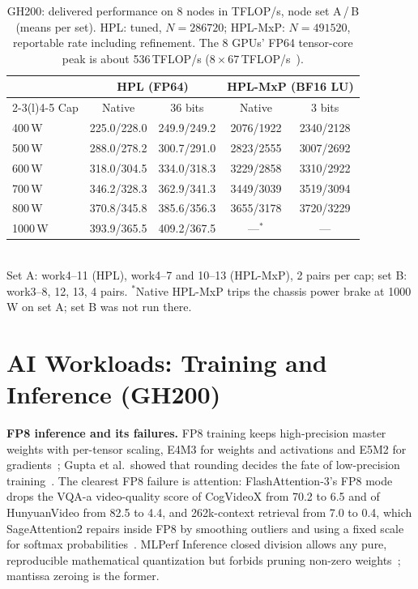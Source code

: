 \documentclass[conference]{IEEEtran}
\newcommand{\W}{\,W}
\begin{document}
\begin{table}[t]
\caption{GH200: delivered performance on 8 nodes in TFLOP/s, node set A\,/\,B (means per set). HPL: tuned, $N=286720$;
HPL-MxP: $N=491520$, reportable rate including refinement. The 8 GPUs' FP64 tensor-core peak is about 536\,TFLOP/s
($8\times67$\,TFLOP/s~\cite{NVIDIAGH200}).}\label{tab:hplperf}
\centering\footnotesize\setlength{\tabcolsep}{3pt}
\begin{tabular}{@{}lcccc@{}}
\toprule
& \multicolumn{2}{c}{HPL (FP64)} & \multicolumn{2}{c}{HPL-MxP (BF16 LU)} \\
\cmidrule(lr){2-3}\cmidrule(l){4-5}
Cap & Native & 36 bits & Native & 3 bits \\
\midrule
400\W & 225.0/228.0 & 249.9/249.2 & 2076/1922 & 2340/2128 \\
500\W & 288.0/278.2 & 300.7/291.0 & 2823/2555 & 3007/2692 \\
600\W & 318.0/304.5 & 334.0/318.3 & 3229/2858 & 3310/2922 \\
700\W & 346.2/328.3 & 362.9/341.3 & 3449/3039 & 3519/3094 \\
800\W & 370.8/345.8 & 385.6/356.3 & 3655/3178 & 3720/3229 \\
1000\W & 393.9/365.5 & 409.2/367.5 & ---$^{*}$ & --- \\
\bottomrule
\end{tabular}
\\[2pt]{\scriptsize Set A: work4--11 (HPL), work4--7 and 10--13 (HPL-MxP), 2 pairs per cap; set B: work3--8, 12, 13, 4 pairs.
$^{*}$Native HPL-MxP trips the chassis power brake at 1000\W{} on set A; set B was not run there.}
\end{table}

\section{AI Workloads: Training and Inference (GH200)}\label{sec:ai}
\textbf{FP8 inference and its failures.} FP8 training keeps high-precision master weights with per-tensor
scaling, E4M3 for weights and activations and E5M2 for gradients~\cite{Micikevicius2022}; Gupta et al.\ showed that
rounding decides the fate of low-precision training~\cite{Gupta2015}. The clearest FP8 failure is attention:
FlashAttention-3's FP8 mode drops the VQA-a video-quality score of CogVideoX from 70.2 to 6.5 and of HunyuanVideo from
82.5 to 4.4, and 262k-context retrieval from 7.0 to 0.4, which SageAttention2 repairs inside FP8 by smoothing outliers and using a fixed scale for softmax
probabilities~\cite{Zhang2025}. MLPerf Inference closed division allows any pure, reproducible mathematical
quantization but forbids pruning non-zero weights~\cite{MLPerfInfRules}; mantissa zeroing is the former.
\end{document}
